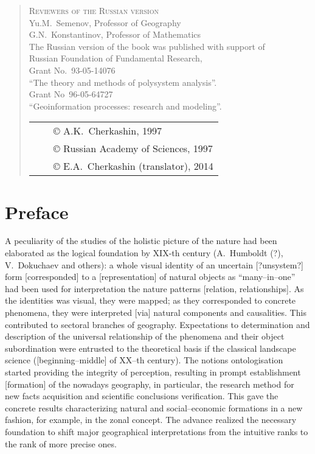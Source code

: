 \documentclass[12pt,leqno]{book}
\begin{document}
\begin{quote}
\begin{center}
\textsc{Reviewers of the Russian version}\\{}
Yu.M.~Semenov, Professor of Geography\\{}
G.N.~Konstantinov, Professor of Mathematics\\{}
\vspace{1em}
The Russian version of the book was published with support of\\{} Russian Foundation of Fundamental Research,\\{}
Grant No.~93-05-14076\\{}
``The theory and methods of polysystem analysis''.\\{}
Grant No~96-05-64727\\{}
``Geoinformation processes: research and modeling''.
\end{center}
\vfill{}
\begin{tabular}{lcl}
{}\hspace{0.4\linewidth}{} & & \copyright{} A.K.~Cherkashin, 1997\\
& & \copyright{} Russian Academy of Sciences, 1997\\
& & \copyright{} E.A.~Cherkashin (translator), 2014
\end{tabular}
\end{quote}
\chapter*{Preface}\normalsize
\pagestyle{plain}



A peculiarity of the studies of the holistic picture of the nature had been elaborated as the logical foundation by XIX-th century (A.~Humboldt (?), V.~Dokuchaev and others): a whole visual identity of an uncertain [?unsystem?] form [corresponded] to a [representation] of natural objects as ``many--in--one'' had been used for interpretation the nature patterns [relation, relationships]. As the identities was visual, they were mapped; as they corresponded to concrete phenomena, they were interpreted [via] natural components and causalities. This contributed to sectoral branches of geography. Expectations to determination and description of the universal relationship of the phenomena and their object subordination were entrusted to the theoretical basis if the classical landscape science ([beginning--middle] of XX--th century). The notions ontologisation started providing the integrity of perception, resulting in prompt establishment [formation] of the nowadays geography, in particular, the research method for new facts acquisition and scientific conclusions verification. This gave the concrete results characterizing natural and social--economic formations in a new fashion, for example, in the zonal concept. The advance realized the necessary foundation to shift major geographical interpretations from the intuitive ranks to the rank of more precise ones.
\end{document}
